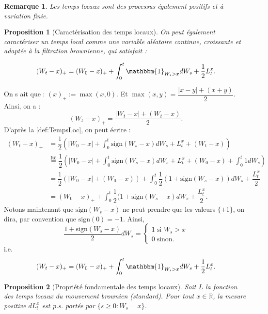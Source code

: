 \documentclass[openany]{book}
\makeatletter
\newcommand{\R}{\mathbb{R}}
\newcommand{\1}{\mathbbm{1}}
\newcommand{\sign}{\text{sign}}
\renewenvironment{proof}[1][\textbf{\textit{Démonstration}}]{%
  \par\pushQED{\qed}%
  \normalfont\topsep6\p@\@plus6\p@\relax
  \trivlist\item[\hskip\labelsep
    #1\@addpunct{.}]\ignorespaces
}{%
  \popQED\endtrivlist\@endpefalse
}
\theoremstyle{thmfont}
\theoremstyle{deffont}
\theoremstyle{thmfont}
\newtheorem{prop}[prop]{Proposition}
\theoremstyle{deffont}
\newtheorem*{remark}{Remarque}
\makeatother
\begin{document}
\begin{remark}
  Les temps locaux sont des processus également \textit{positifs} et à \textit{variation finie}.
\end{remark}

\begin{prop}[Caractérisation des temps locaux]
  On peut également caractériser un \textit{temps local} comme une variable aléatoire continue, croissante et adaptée à la filtration brownienne, qui satisfait :

  \begin{equation}
    (W_t - x)_+ = (W_0 - x)_+ + \int_0^t \1_{W_s > x}dW_s + \dfrac{1}{2}L_t^x.
  \end{equation}
\end{prop}

\begin{proof}
  On s
  ait que : $(x)_+ := \max(x, 0)$. Et $\max(x,y) = \dfrac{|x-y| + (x+y)}{2}$.
  Ainsi, on a : $$(W_t - x)_+ = \dfrac{|W_t - x| + (W_t - x)}{2}.$$
  D'après la \autoref{def:TempsLoc}, on peut écrire :
  \begin{align*}
    (W_t - x)_+ &= \dfrac{1}{2}\left(|W_0 - x| + \int_0^t\sign(W_s - x)dW_s + L_t^x + (W_t - x)\right)\\
    &\overset{\text{Itō}}{=} \dfrac{1}{2} \left(|W_0 - x| + \int_0^t\sign(W_s - x)dW_s + L_t^x + (W_0 - x) + \int_0^t 1 dW_s \right)\\
    &= \dfrac{1}{2} \left(|W_0 - x| + (W_0 - x) \right) + \int_0^t\dfrac{1}{2}(1 + \sign(W_s - x))dW_s + \dfrac{L_t^x}{2}\\
    &= (W_0 - x)_+ + \int_0^t\dfrac{1}{2}(1 + \sign(W_s - x) dW_s + \dfrac{L_t^x}{2}.
  \end{align*}
  Notons maintenant que $\sign(W_s - x)$ ne peut prendre que les valeurs $\{\pm 1\}$, on dira, par convention que $\sign(0) = -1$. Ainsi,
  $$ \dfrac{1 + \sign(W_s - x)}{2}dW_s =
  \begin{cases} 1\; \text{si } W_s > x\\
                0 \; \text{sinon.}
  \end{cases}
  $$
 i.e.
 $$(W_t - x)_+ = (W_0 - x)_+ + \int_0^t\1_{W_s > x} dW_s + \frac{1}{2}L_t^x.$$
  
\end{proof}

\begin{prop}[Propriété fondamentale des temps locaux]
Soit $L$ la fonction des temps locaux du mouvement brownien (standard). Pour tout $x \in \R$, la mesure positive $dL^x_t$ est p.s. portée par $\{s \geq 0 : W_s = x\}$.  
\end{prop}
\end{document}
